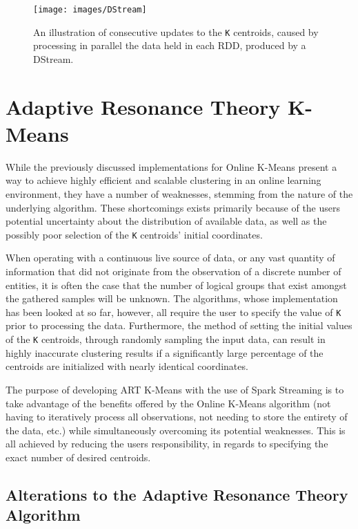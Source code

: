 \documentclass{l4proj}
\begin{document}
\begin{figure}[H]
	\centering
    \label{DStream}
    \texttt{[image: images/DStream]}
    \caption{An illustration of consecutive updates to the \texttt{K} centroids, caused by processing in parallel the data held in each RDD, produced by a DStream.} 
\end{figure}


\chapter{Adaptive Resonance Theory K-Means}
\label{art}

While the previously discussed implementations for Online K-Means present a way to achieve highly efficient and scalable clustering in an online learning environment, they have a number of weaknesses, stemming from the nature of the underlying algorithm. These shortcomings exists primarily because of the users potential uncertainty about the distribution of available data, as well as the possibly poor selection of the \texttt{K} centroids' initial coordinates.

When operating with a continuous live source of data, or any vast quantity of information that did not originate from the observation of a discrete number of entities, it is often the case that the number of logical groups that exist amongst the gathered samples will be unknown. The algorithms, whose implementation has been looked at so far, however, all require the user to specify the value of \texttt{K} prior to processing the data. Furthermore, the method of setting the initial values of the \texttt{K} centroids, through randomly sampling the input data, can result in highly inaccurate clustering results if a significantly large percentage of the centroids are  initialized with nearly identical coordinates\cite{PlusPlus}.

The purpose of developing ART K-Means with the use of Spark Streaming is to take advantage of the benefits offered by the Online K-Means algorithm (not having to iteratively process all observations, not needing to store the entirety of the data, etc.) while simultaneously overcoming its potential weaknesses. This is all achieved by reducing the users responsibility, in regards to specifying the exact number of desired centroids.

\section{Alterations to the Adaptive Resonance Theory Algorithm}
\end{document}
